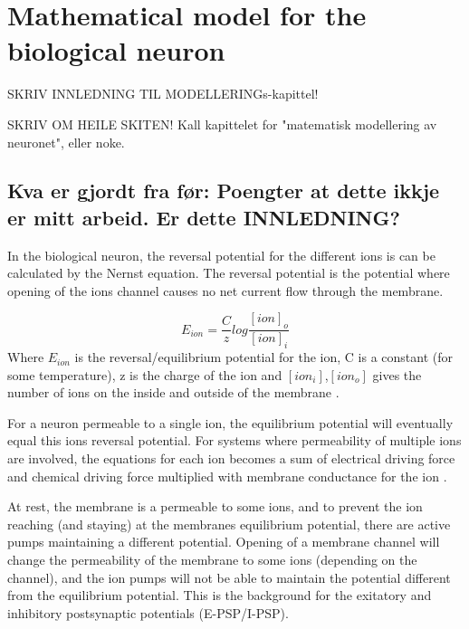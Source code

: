 
% 
% 
%

\chapter{Mathematical model for the biological neuron} %
\label{secMatematiskModelleringAvBioNeuron}
SKRIV INNLEDNING TIL MODELLERINGs-kapittel!

SKRIV OM HEILE SKITEN!
Kall kapittelet for "matematisk modellering av neuronet", eller noke.
\section{Kva er gjordt fra før: Poengter at dette ikkje er mitt arbeid. Er dette INNLEDNING?}
In the biological neuron, the reversal potential for the different ions is can be calculated by the Nernst equation. 
The reversal potential is the potential where opening of the ions channel causes no net current flow through the membrane.

\begin{equation}
 	E_{ion} = \frac{C}{z} log\frac{[ion]_o}{[ion]_i}
\end{equation}
Where $E_{ion}$ is the reversal/equilibrium potential for the ion, C is a constant (for some temperature), z is the charge of the ion and $[ion_i]$,$[ion_o]$ gives the number of ions on the inside and outside of the membrane
\cite{NeuroscienceExploringTheBrain3edKAP3}.

For a neuron permeable to a single ion, the equilibrium potential will eventually equal this ions reversal potential. %
For systems where permeability of multiple ions are involved, the equations for each ion becomes a sum of electrical driving force and chemical driving force multiplied with membrane conductance for the ion
\cite{PrinciplesOfNeuralScience4edKAP07}.

At rest, the membrane is a permeable to some ions, and to prevent the ion reaching (and staying) at the membranes equilibrium potential, there are active pumps maintaining a different potential. 
Opening of a membrane channel will change the permeability of the membrane to some ions (depending on the channel), and the ion pumps will not be able to maintain the potential different from the equilibrium potential. 
This is the background for the exitatory and inhibitory postsynaptic potentials (E-PSP/I-PSP)\cite{PrinciplesOfNeuralScience4edKAP07}.

